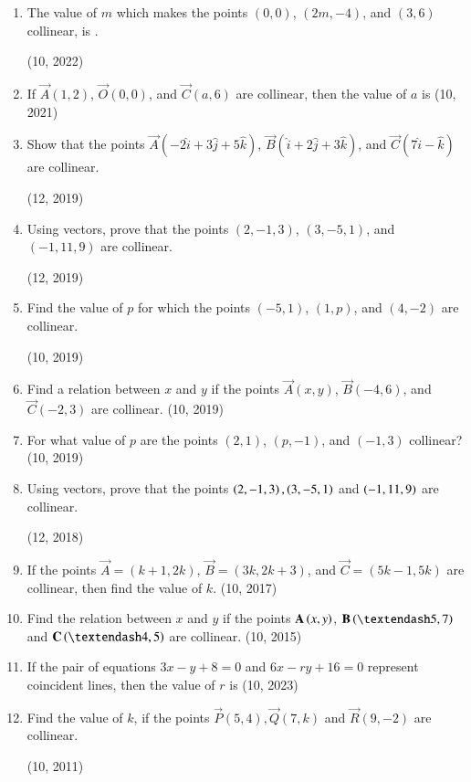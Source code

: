 \begin{enumerate}[label=\thesubsection.\arabic*, ref=\thesubsection.\theenumi]
    \item The value of $m$ which makes the points $(0,0)$, $(2m, -4)$, and $(3,6)$ collinear, is \underline{\hspace{1cm}}.

    \hfill (10, 2022)
		\item If $\vec{A}(1, 2)$, $\vec{O}(0, 0)$, and $\vec{C}(a, 6)$ are collinear, then the value of $a$ is
		\hfill (10, 2021)
	\item Show that the points $\vec{A}(-2\hat{i} + 3\hat{j} + 5\hat{k})$, $\vec{B}(\hat{i} + 2\hat{j} + 3\hat{k})$, and $\vec{C}(7\hat{i} - \hat{k})$ are collinear.

		\hfill (12, 2019)
	\item Using vectors, prove that the points $(2, -1, 3)$, $(3, -5, 1)$, and $(-1, 11, 9)$ are collinear.

		\hfill (12, 2019)
\item Find the value of $p$ for which the points $(-5, 1)$, $(1, p)$, and $(4, -2)$ are collinear.

	\hfill (10, 2019)
\item Find a relation between $x$ and $y$ if the points $\vec{A}(x, y)$, $\vec{B}(-4, 6)$, and $\vec{C}(-2, 3)$ are collinear. \hfill (10, 2019)
\item For what value of $p$ are the points $(2, 1)$, $(p, -1)$, and $(-1, 3)$ collinear? \hfill (10, 2019)
\item Using vectors, prove that the points $\left(2,-1,3\right),\left(3,-5,1\right)$ and $\left(-1,11,9\right)$ are collinear.

\hfill (12, 2018) 
\item If the points $\vec{A} = (k+1, 2k)$, $\vec{B} = (3k, 2k + 3)$, and $\vec{C} = (5k-1, 5k)$ are collinear, then find the value of $k$. \hfill (10, 2017)
\item Find the relation between $x$ and $y$ if the points $\mathbf{A}\left(x,y\right)$, $\vec{B}\brak{–5,7}$ and $\vec{C}\brak{–4, 5}$ are collinear. \hfill (10, 2015)
  \item If the pair of equations $3x-y+8=0$ and $6x-ry+16=0$ represent coincident lines, then the value of $r$ is
     \hfill (10, 2023)
    \item Find the value of $k$, if the points $\vec{P}(5,4),\vec{Q}(7,k)$ and $\vec{R}(9,-2)$ are collinear.

\hfill (10, 2011)
\end{enumerate}
